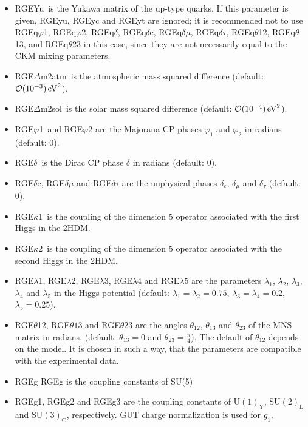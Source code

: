 \documentclass[10pt,a4paper,twoside]{scrartcl}
\begin{document}
\begin{itemize}
\item RGEYu\ is the Yukawa matrix of the up-type quarks.
  If this parameter is given, RGEyu, RGEyc and RGEyt are ignored;
  it is recommended not to use RGEq$\varphi$1, RGEq$\varphi$2,
  RGEq$\delta$, RGEq$\delta$e, RGEq$\delta\mu$, RGEq$\delta\tau$,
  RGEq$\theta$12, RGEq$\theta$13, and RGEq$\theta$23 in this case, since
  they are not necessarily equal to the CKM mixing parameters.
\item RGE$\Delta$m2atm\ is the atmospheric mass squared difference (default: $ \mathcal{O}(10^{-3}) \,\mathrm{eV}^2$).
\item RGE$\Delta$m2sol\ is the solar mass squared difference (default:
  $\mathcal{O}(10^{-4}) \,\mathrm{eV}^2$).
\item RGE$\varphi$1\ and RGE$\varphi2$ are the Majorana CP phases $\varphi_1$ and $\varphi_2$ in radians (default: $0$).
  
\item RGE$\delta$\ is the Dirac CP phase $\delta$ in radians (default: $0$).
\item RGE$\delta$e, RGE$\delta\mu$ and RGE$\delta\tau$ are the unphysical phases $\delta_e$,
  $\delta_\mu$ and $\delta_\tau$ (default: $0$). 
\item RGE$\kappa$1\ is the coupling of the dimension 5 operator associated
  with the first Higgs in the 2HDM.
  
\item RGE$\kappa$2\ is the coupling of the dimension 5 operator associated
  with the second Higgs in the 2HDM.
  
\item RGE$\lambda$1, RGE$\lambda2$, RGE$\lambda3$, RGE$\lambda4$ and RGE$\lambda5$ are the parameters
$\lambda_1$, $\lambda_2$, $\lambda_3$, $\lambda_4$ and $\lambda_5$ in the Higgs potential
(default: $\lambda_1=\lambda_2=0.75$, $\lambda_3=\lambda_4=0.2$, $\lambda_5=0.25$).
\item RGE$\theta$12, RGE$\theta13$ and RGE$\theta23$ are the angles $\theta_{12}$, $\theta_{13}$
and $\theta_{23}$ of the MNS matrix in radians. (default: $\theta_{13}=0$ and
$\theta_{23}=\frac{\pi}{4}$). The default of $\theta_{12}$ depends on the
model. It is chosen in such a way, that the parameters are compatible with the
experimental data. 
\item RGEg RGEg is the coupling constants of SU(5)
  
\item RGEg1, RGEg2 and RGEg3 are the coupling constants of U$(1)_\mathrm{Y}$,
  SU$(2)_\mathrm{L}$ and SU$(3)_\mathrm{C}$, respectively.  GUT charge
  normalization is used for $g_1$.
  

\end{itemize}
\end{document}
